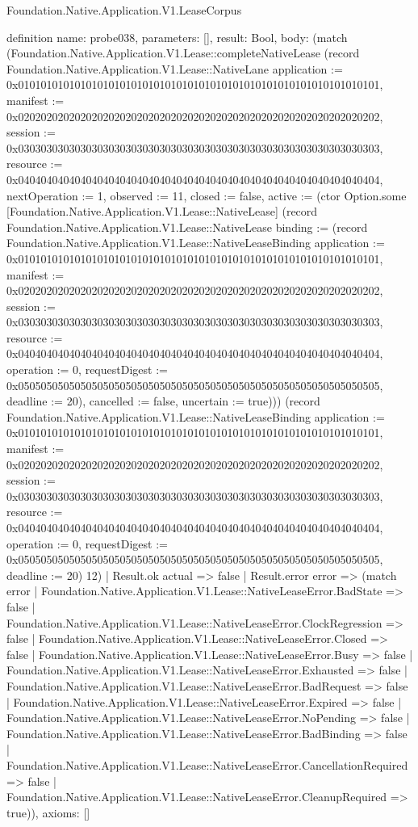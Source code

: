 \begin{lexlean}{Foundation.Native.Application.V1.LeaseCorpus}
\begin{semanticmodule}
definition{
  name: probe038,
  parameters: [],
  result: Bool,
  body: (match (Foundation.Native.Application.V1.Lease::completeNativeLease (record Foundation.Native.Application.V1.Lease::NativeLane {application := 0x0101010101010101010101010101010101010101010101010101010101010101, manifest := 0x0202020202020202020202020202020202020202020202020202020202020202, session := 0x0303030303030303030303030303030303030303030303030303030303030303, resource := 0x0404040404040404040404040404040404040404040404040404040404040404, nextOperation := 1, observed := 11, closed := false, active := (ctor Option.some [Foundation.Native.Application.V1.Lease::NativeLease] (record Foundation.Native.Application.V1.Lease::NativeLease {binding := (record Foundation.Native.Application.V1.Lease::NativeLeaseBinding {application := 0x0101010101010101010101010101010101010101010101010101010101010101, manifest := 0x0202020202020202020202020202020202020202020202020202020202020202, session := 0x0303030303030303030303030303030303030303030303030303030303030303, resource := 0x0404040404040404040404040404040404040404040404040404040404040404, operation := 0, requestDigest := 0x0505050505050505050505050505050505050505050505050505050505050505, deadline := 20}), cancelled := false, uncertain := true}))}) (record Foundation.Native.Application.V1.Lease::NativeLeaseBinding {application := 0x0101010101010101010101010101010101010101010101010101010101010101, manifest := 0x0202020202020202020202020202020202020202020202020202020202020202, session := 0x0303030303030303030303030303030303030303030303030303030303030303, resource := 0x0404040404040404040404040404040404040404040404040404040404040404, operation := 0, requestDigest := 0x0505050505050505050505050505050505050505050505050505050505050505, deadline := 20}) 12)
    | Result.ok actual => false
    | Result.error error => (match error
      | Foundation.Native.Application.V1.Lease::NativeLeaseError.BadState => false
      | Foundation.Native.Application.V1.Lease::NativeLeaseError.ClockRegression => false
      | Foundation.Native.Application.V1.Lease::NativeLeaseError.Closed => false
      | Foundation.Native.Application.V1.Lease::NativeLeaseError.Busy => false
      | Foundation.Native.Application.V1.Lease::NativeLeaseError.Exhausted => false
      | Foundation.Native.Application.V1.Lease::NativeLeaseError.BadRequest => false
      | Foundation.Native.Application.V1.Lease::NativeLeaseError.Expired => false
      | Foundation.Native.Application.V1.Lease::NativeLeaseError.NoPending => false
      | Foundation.Native.Application.V1.Lease::NativeLeaseError.BadBinding => false
      | Foundation.Native.Application.V1.Lease::NativeLeaseError.CancellationRequired => false
      | Foundation.Native.Application.V1.Lease::NativeLeaseError.CleanupRequired => true)),
  axioms: []
}


\end{semanticmodule}
\end{lexlean}
